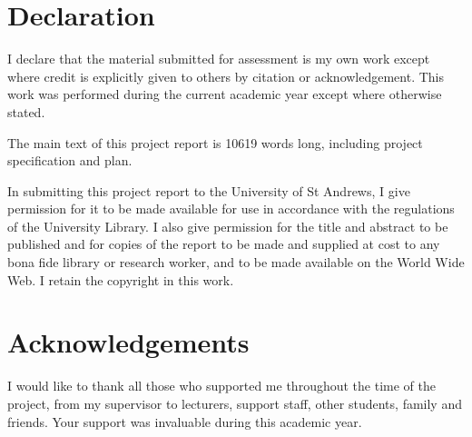 

\section*{Declaration}
I declare that the material submitted for assessment is my own work except where credit is explicitly given to others by citation or acknowledgement. This work was performed during the current academic year except where otherwise stated.
\par \vspace{\baselineskip}
The main text of this project report is 10619 words long, including project specification and plan.
\par \vspace{\baselineskip}
In submitting this project report to the University of St Andrews, I give permission for it to be made available for use in accordance with the regulations of the University Library. I also give permission for the title and abstract to be published and for copies of the report to be made and supplied at cost to any bona fide library or research worker, and to be made available on the World Wide Web. I retain the copyright in this work.

\section*{Acknowledgements}
I would like to thank all those who supported me throughout the time of the project, from my supervisor to lecturers, support staff, other students, family and friends. Your support was invaluable during this academic year.